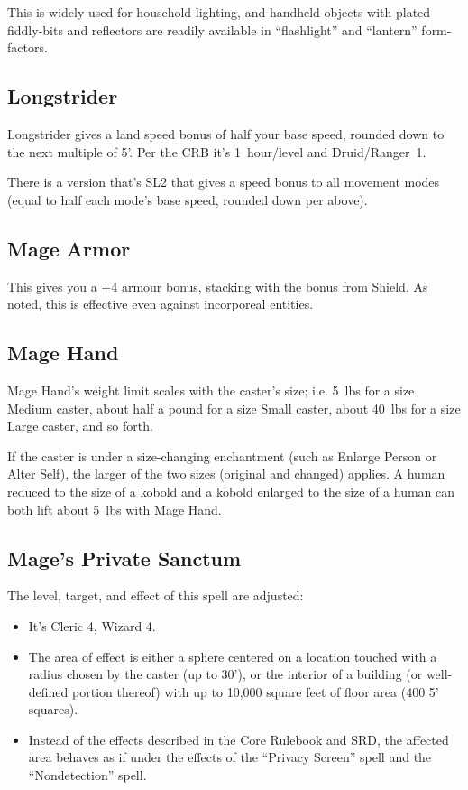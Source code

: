 This is widely used for household lighting, and handheld objects with
plated fiddly-bits and reflectors are readily available in ``flashlight''
and ``lantern'' form-factors.
%

%
\subsection{Longstrider}

Longstrider gives a land speed bonus of half your base speed, rounded down
to the next multiple of 5'. Per the CRB it's 1~hour/level and
Druid/Ranger~1.

There is a version that's SL2 that gives a speed bonus to all movement
modes (equal to half each mode's base speed, rounded down per above).
%

%
\subsection{Mage Armor}

This gives you a +4 armour bonus, stacking with the bonus from Shield. As
noted, this is effective even against incorporeal entities.
%

%
\subsection{Mage Hand}

Mage Hand's weight limit scales with the caster's size; i.e. 5~lbs for a
size Medium caster, about half a pound for a size Small caster, about 40~lbs
for a size Large caster, and so forth.

If the caster is under a size-changing enchantment (such as Enlarge Person or
Alter Self), the larger of the two sizes (original and changed) applies. A
human reduced to the size of a kobold and a kobold enlarged to the size of a
human can both lift about 5~lbs with Mage Hand.
%

%
\subsection{Mage's Private Sanctum}

The level, target, and effect of this spell are adjusted:

\begin{itemize}
\item It's Cleric 4, Wizard 4.
\item The area of effect is either a sphere centered on a location touched
with a radius chosen by the caster (up to 30'), or the interior of a
building (or well-defined portion thereof) with up to 10,000 square feet of
floor area (400 5' squares).
\item Instead of the effects described in the Core Rulebook and SRD, the
affected area behaves as if under the effects of the ``Privacy Screen''
spell and the ``Nondetection'' spell.
\end{itemize}

